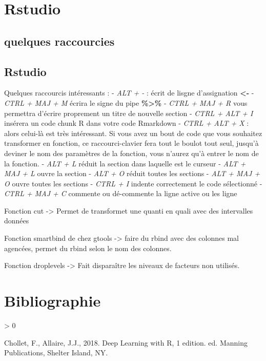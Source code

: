 \documentclass[
]{article}
\newlength{\cslhangindent}
\newenvironment{CSLReferences}[2] %
 {%
  \setlength{\parindent}{0pt}
  \ifodd #1 \everypar{\setlength{\hangindent}{\cslhangindent}}\ignorespaces\fi
  \ifnum #2 > 0
  \setlength{\parskip}{#2\baselineskip}
  \fi
 }%
 {}
\begin{document}
\hypertarget{rstudio}{%
\section{Rstudio}\label{rstudio}}

\hypertarget{quelques-raccourcies}{%
\subsection{quelques raccourcies}\label{quelques-raccourcies}}

\hypertarget{rstudio-1}{%
\subsection{Rstudio}\label{rstudio-1}}

Quelques raccourcis intéressants : - \emph{ALT + -} : écrit de lisgne
d'assignation \textbf{\textless-} - \emph{CTRL + MAJ + M} écrira le
signe du pipe \textbf{\%\textgreater\%} - \emph{CTRL + MAJ + R} vous
permettra d'écrire proprement un titre de nouvelle section - \emph{CTRL
+ ALT + I} insérera un code chunk R dans votre code Rmarkdown -
\emph{CTRL + ALT + X} : alors celui-là est très intéressant. Si vous
avez un bout de code que vous souhaitez transformer en fonction, ce
raccourci-clavier fera tout le boulot tout seul, jusqu'à deviner le nom
des paramètres de la fonction, vous n'aurez qu'à entrer le nom de la
fonction. - \emph{ALT + L} réduit la section dans laquelle est le
curseur - \emph{ALT + MAJ + L} ouvre la section - \emph{ALT + O} réduit
toutes les sections - \emph{ALT + MAJ + O} ouvre toutes les sections -
\emph{CTRL + I} indente correctement le code sélectionné - \emph{CTRL +
MAJ + C} commente ou dé-commente la ligne active ou les ligne

Fonction cut -\textgreater{} Permet de transformet une quanti en quali
avec des intervalles données

Fonction smartbind de chez gtools -\textgreater{} faire du rbind avec
des colonnes mal agencées, permet du rbind selon le nom des colonnes.

Fonction droplevels -\textgreater{} Fait disparaître les niveaux de
facteurs non utilisés.

\pagebreak

\hypertarget{bibliographie}{%
\section*{Bibliographie}\label{bibliographie}}

\hypertarget{refs}{}
\begin{CSLReferences}{1}{0}
\leavevmode\hypertarget{ref-chollet_deep_2018}{}%
Chollet, F., Allaire, J.J., 2018. Deep {Learning} with {R}, 1 edition.
ed. Manning Publications, Shelter Island, NY.

\end{CSLReferences}
\end{document}
